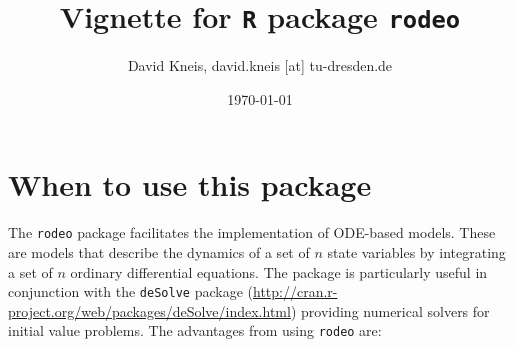 \documentclass[times,onecolumn]{article}
\begin{document}


\newcommand{\software}[1]{\texttt{#1}}

\newcommand{\figdir}{.}
\newcommand{\sect}{Section}
\newcommand{\sects}{Sections}

\newcommand{\oxygen}{O\ensuremath{_{2}}}
\newcommand{\OM}{\textrm{OM}}
\newcommand{\DO}{\textrm{DO}}

\newcommand{\todo}[1]{\textcolor{red}{\textbf{#1}}}

\newcommand{\grey}[1]{\textcolor{gray}{#1}}

\title{Vignette for \software{R} package \software{rodeo}}

\author{David Kneis, david.kneis [at] tu-dresden.de}

\date{\today}

\maketitle

\tableofcontents

\section{When to use this package}

The \software{rodeo} package facilitates the implementation of ODE-based models. These are models that describe the dynamics of a set of $n$ state variables by integrating a set of $n$  ordinary differential equations. The package is particularly useful in conjunction with the \software{deSolve} package (\url{http://cran.r-project.org/web/packages/deSolve/index.html}) providing numerical solvers for initial value problems. The advantages from using \software{rodeo} are:
\end{document}
